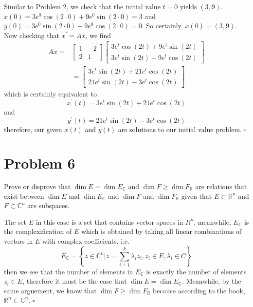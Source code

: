 \documentclass[11pt]{article}
\newcommand{\C}{\mathbb{C}}
\newcommand{\R}{\mathbb{R}}
\newcommand{\set}[1]{\left\{ #1\right\}}
\newenvironment{proof}{\noindent{\bf Proof.}}{\hfill $\square$\medskip}
\begin{document}
\begin{proof}
Similar to Problem 2, we check that the initial value $t=0$ yields $(3,9)$.
$x(0)=3e^{0}\cos(2\cdot0)+9e^{0}\sin(2\cdot0)=3$ and $y(0)=3e^{0}\sin(2\cdot 0)-9e^{0}\cos(2\cdot 0)=0$.
So certainly, $x(0)=(3,9)$. Now checking that $x^{\prime}=Ax$, we find
\begin{equation}
    \begin{split}
        Ax=&\begin{bmatrix}
            1 & -2 \\
            2 & 1
        \end{bmatrix}\begin{bmatrix}
            3e^{t}\cos(2t)+9e^{t}\sin(2t)\\
            3e^{t}\sin(2t)-9e^{t}\cos(2t)
        \end{bmatrix}\\
        &=\begin{bmatrix}
            3e^{t}\sin(2t)+21e^{t}\cos(2t)\\
            21e^{t}\sin(2t)-3e^{t}\cos(2t)
        \end{bmatrix}
    \end{split}
\end{equation}
which is certainly equivalent to
$$x^{\prime}(t)=3e^{t}\sin(2t)+21e^{t}\cos(2t)$$
and
$$y^{\prime}(t)=21e^{t}\sin(2t)-3e^{t}\cos(2t)$$
therefore, our given $x(t)$ and $y(t)$ are solutions to our initial value problem.
\end{proof}

\section{Problem 6}
Prove or disprove that $\dim E=\dim E_{\C}$ and $\dim F\geq \dim F_{\R}$ are relations
that exist between $\dim E$ and $\dim E_{\C}$ and $\dim F$ and $\dim F_{\R}$ given that
$E\subset \R^{n}$ and $F\subset \C^{n}$ are subspaces.

\begin{proof}
The set $E$ in this case is a set that contains vector spaces in $R^{n}$, meanwhile, $E_{\C}$
is the complexification of $E$ which is obtained by taking all linear combinations of vectors in $E$
with complex coefficients, i.e.
$$E_{\C}=\set{z\in \C^{n}|z=\sum_{i=1}^{k}\lambda_{i}z_{i},z_{i}\in E,\lambda_{i}\in C}$$
then we see that the number of elements in $E_{\C}$ is exactly the number of elements $z_{i}\in E$,
therefore it must be the case that $\dim E=\dim E_{\C}$. Meanwhile, by the same arguement, 
we  know that $\dim F\geq\dim F_{\R}$ because according to the book, $\R^{n}\subset\C^{n}$.
\end{proof}
\end{document}
